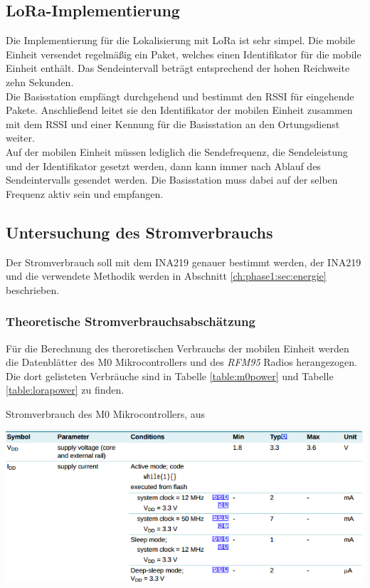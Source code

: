 \subsection{LoRa-Implementierung}
Die Implementierung für die Lokalisierung mit LoRa ist sehr simpel.
Die mobile Einheit versendet regelmäßig ein Paket, welches einen Identifikator für die mobile Einheit enthält.
Das Sendeintervall beträgt entsprechend der hohen Reichweite zehn Sekunden.\\
Die Basisstation empfängt durchgehend und bestimmt den RSSI für eingehende Pakete.
Anschließend leitet sie den Identifikator der mobilen Einheit zusammen mit dem RSSI und einer Kennung für die Basisstation an den Ortungsdienst weiter.\\
Auf der mobilen Einheit müssen lediglich die Sendefrequenz, die Sendeleistung und der Identifikator gesetzt werden, dann kann immer nach Ablauf des Sendeintervalls gesendet werden.
Die Basisstation muss dabei auf der selben Frequenz aktiv sein und empfangen.


\subsection{Untersuchung des Stromverbrauchs}
Der Stromverbrauch soll mit dem INA219 genauer bestimmt werden, der INA219 und die verwendete Methodik werden in Abschnitt \ref{ch:phase1:sec:energie} beschrieben.

\subsubsection{Theoretische Stromverbrauchsabschätzung}
Für die Berechnung des theroretischen Verbrauchs der mobilen Einheit werden die Datenblätter des M0 Mikrocontrollers und des \emph{RFM95} Radios herangezogen. 
Die dort gelisteten Verbräuche sind in Tabelle \ref{table:m0power} und Tabelle \ref{table:lorapower} zu finden.

\begin{table}[h]
  \centering
  \caption{Stromverbrauch des M0 Mikrocontrollers, aus \cite{nxp2016m0}}
	\includegraphics[width=\textwidth]{images/m0power.png}
  \label{table:m0power}
\end{table}

